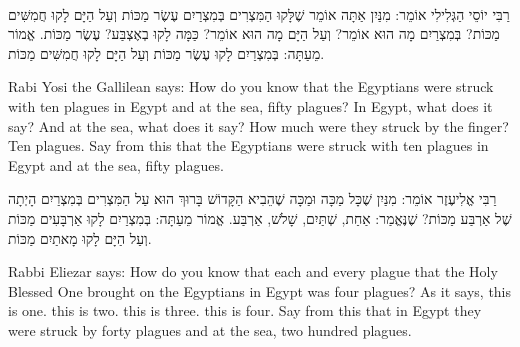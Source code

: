 \ \\ 


רַבִּי יוֹסֵי הַגְּלִילִי אוֹמֵר: מִנַּיִן אַתָּה אוֹמֵר שֶׁלָּקוּ הַמִּצְרִים בְּמִצְרַיִם עֶשֶׂר מַכּוֹת וְעַל הַיָּם לָקוּ חֲמִשִּׁים מַכּוֹת? בְּמִצְרַיִם מָה הוּא אוֹמֵר?
וְעַל הַיָּם מָה הוּא אוֹמֵר?
כַּמָּה לָקוּ בְאֶצְבַּע? עֶשֶׂר מַכּוֹת. אֱמוֹר מֵעַתָּה: בְּמִצְרַיִם לָקוּ עֶשֶׂר מַכּוֹת וְעַל הַיָּם לָקוּ חֲמִשִּׁים מַכּוֹת.

\begin{english}
Rabi Yosi the Gallilean says: How do you know that the Egyptians were struck with ten plagues in Egypt and at the sea, fifty plagues? In Egypt, what does it say?  And at the sea, what does it say?  How much were they struck by the finger? Ten plagues. Say from this that the Egyptians were struck with ten plagues in Egypt and at the sea, fifty plagues.
\end{english}

\break

רַבִּי אֱלִיעֶזֶר אוֹמֵר: מִנַּיִן שֶׁכָּל מַכָּה וּמַכָּה שֶׁהֵבִיא הַקָּדוֹשׁ בָּרוּךְ הוּא עַל הַמִּצְרִים בְּמִצְרַיִם הָיְתָה שֶׁל אַרְבַּע מַכּוֹת? שֶׁנֶּאֱמַר:
אַחַת,
שְׁתַּיִם,
שָׁלשׁ,
אַרְבַּע. אֱמוֹר מֵעַתָּה: בְּמִצְרַיִם לָקוּ אַרְבָּעִים מַכּוֹת וְעַל הַיָּם לָקוּ מָאתַיִם מַכּוֹת.

\begin{english}
Rabbi Eliezar says: How do you know that each and every plague that the Holy Blessed One brought on the Egyptians in Egypt was four plagues? As it says,   this is one.  this is two.  this is three.  this is four. Say from this that in Egypt they were struck by forty plagues and at the sea, two hundred plagues.
\end{english}

